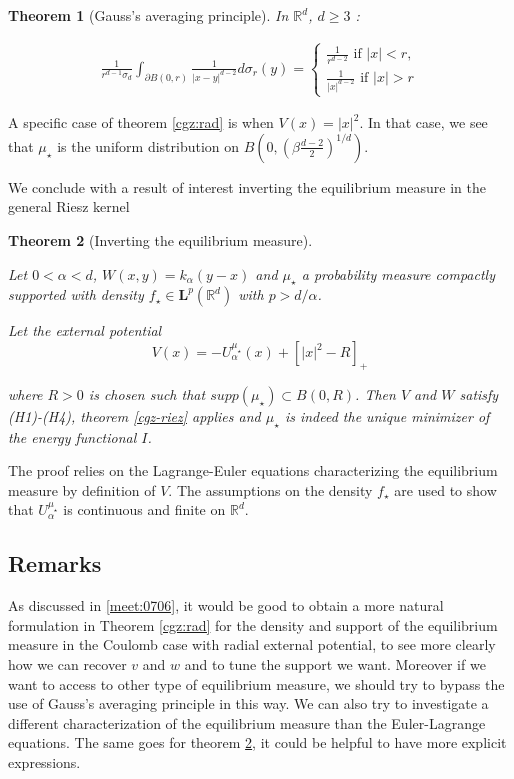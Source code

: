 \documentclass[a4paper,12pt]{report}
\newtheorem{thm}{Theorem}
\begin{document}
\begin{thm}[Gauss's averaging principle]
In $\mathbb{R}^{d}$, $d\geq 3$ :

\begin{align*}
    \frac{1}{r^{d-1}\sigma_{d}}\int_{\partial B(0, r)} \frac{1}{\lvert x-y\rvert^{d-2}} d\sigma_{r}(y) =  \left\{\begin{array}{c}
	\frac{1}{r^{d-2}}\text{  if } \lvert x \rvert < r,\\
	\frac{1}{\lvert x\rvert^{d-2}}  \text{  if } \lvert x\rvert > r
\end{array}\right.
\end{align*}
\end{thm}

A specific case of theorem \ref{cgz:rad} is when $V(x) = \lvert x\rvert^{2}$. In that case, we see that $\mu_{\star}$ is the uniform distribution on $B\left(0, \left(\beta \frac{d-2}{2}\right)^{1/d}\right)$.
\vspace{0.5cm}

We conclude with a result of interest inverting the equilibrium measure in the general Riesz kernel 

\begin{thm}[Inverting the equilibrium measure]\label{cgz:inv}

Let $0 < \alpha < d$, $W(x, y) = k_{\alpha}(y-x)$ and $\mu_{\star}$ a probability measure compactly supported with density $f_{\star} \in \textbf{L}^{p}(\mathbb{R}^{d})$ with $p > d/\alpha$.

Let the external potential 
\[V(x) = - U_{\alpha}^{\mu_{\star}}(x) + \left[ \lvert x\rvert^{2} - R\right]_{+}\]

where $R > 0$ is chosen such that $supp(\mu_{\star}) \subset B(0, R)$. Then $V$ and $W$ satisfy (H1)-(H4), theorem \ref{cgz-riez} applies and $\mu_{\star}$ is indeed the unique minimizer of the energy functional $I$.
\end{thm}

The proof relies on the Lagrange-Euler equations characterizing the equilibrium measure by definition of $V$. The assumptions on the density $f_{\star}$ are used to show that $U_{\alpha}^{\mu_{\star}}$ is continuous and finite on $\mathbb{R}^{d}$.


\subsection{Remarks}

As discussed in \ref{meet:0706}, it would be good to obtain a more natural formulation in Theorem \ref{cgz:rad} for the density and support of the equilibrium measure in the Coulomb case with radial external potential, to see more clearly how we can recover $v$ and $w$ and to tune the support we want. Moreover if we want to access to other type of equilibrium measure, we should try to bypass the use of Gauss's averaging principle in this way. We can also try to investigate a different characterization of the equilibrium measure than the Euler-Lagrange equations. The same goes for theorem \ref{cgz:inv}, it could be helpful to have more explicit expressions.
\vspace{0.5cm}
\end{document}
